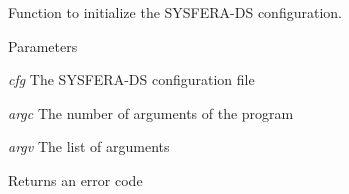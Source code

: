 Function to initialize the SYSFERA-\/DS configuration. 


\begin{DoxyParams}{Parameters}
\item[{\em cfg}]The SYSFERA-\/DS configuration file \item[{\em argc}]The number of arguments of the program \item[{\em argv}]The list of arguments \end{DoxyParams}
\begin{DoxyReturn}{Returns}
an error code 
\end{DoxyReturn}
